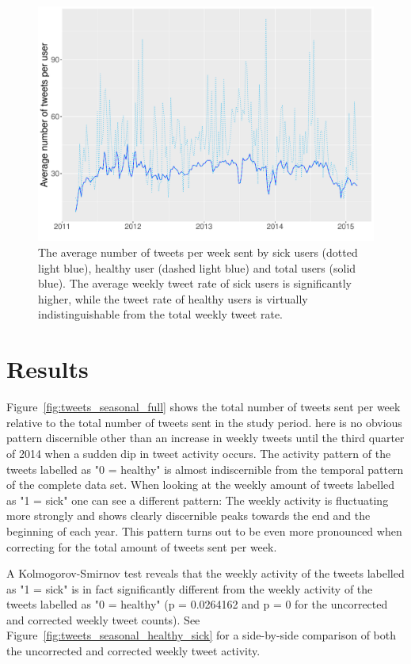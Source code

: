 \documentclass[11pt, a4paper]{article}\usepackage[]{graphicx}\usepackage[]{color}
\begin{document}
\begin{figure}[h]
\centering
\includegraphics[width=1\linewidth]{avg_tw_sick_healthy.pdf}
\caption{The average number of tweets per week sent by sick users (dotted light blue), healthy user (dashed light blue) and total users (solid blue). The average weekly tweet rate of sick users is significantly higher, while the tweet rate of healthy users is virtually indistinguishable from the total weekly tweet rate.}
\label{fig:avg_tw_diff}
\end{figure}

\section{Results}
Figure~\ref{fig:tweets_seasonal_full} shows the total number of tweets sent per week relative to the total number of tweets sent in the study period. here is no obvious pattern discernible other than an increase in weekly tweets until the third quarter of 2014 when a sudden dip in tweet activity occurs. The activity pattern of the tweets labelled as "0 = healthy" is almost indiscernible from the temporal pattern of the complete data set. When looking at the weekly amount of tweets labelled as "1 = sick" one can see a different pattern: The weekly activity is fluctuating more strongly and shows clearly discernible peaks towards the end and the beginning of each year. This pattern turns out to be even more pronounced when correcting for the total amount of tweets sent per week.\newline

A Kolmogorov-Smirnov test reveals that the weekly activity of the tweets labelled as "1 = sick" is in fact significantly different from the weekly activity of the tweets labelled as "0 = healthy" (p = 0.0264162 and p = 0 for the uncorrected and corrected weekly tweet counts). See Figure~\ref{fig:tweets_seasonal_healthy_sick} for a side-by-side comparison of both the uncorrected and corrected weekly tweet activity.\newline
\end{document}
